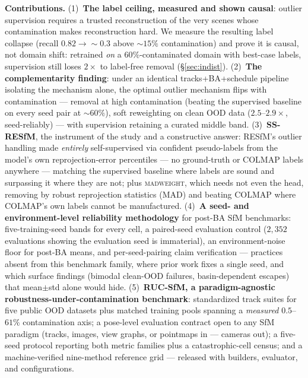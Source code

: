 \documentclass[10pt,twocolumn,letterpaper]{article}
\newcommand{\mad}{\textsc{madweight}}
\begin{document}
\noindent\textbf{Contributions.}
(1)~\textbf{The label ceiling, measured and shown causal}: outlier supervision requires a
trusted reconstruction of the very scenes whose contamination makes reconstruction hard.
We measure the resulting label collapse (recall $0.82\!\to\!\sim\!0.3$ above
${\sim}15\%$ contamination) and prove it is causal, not domain shift: retrained
\emph{on} a $60\%$-contaminated domain with best-case labels, supervision still loses
$2\times$ to label-free removal (\S\ref{sec:indist}).
(2)~\textbf{The complementarity finding}: under an identical tracks+BA+schedule pipeline
isolating the mechanism alone, the optimal outlier mechanism flips with contamination ---
removal at high contamination (beating the supervised baseline on every seed pair at
$\sim\!60\%$), soft reweighting on clean OOD data ($2.5$--$2.9\times$, seed-reliably) ---
with supervision retaining a curated middle band.
(3)~\textbf{SS-RESfM}, the instrument of the study and a constructive answer: RESfM's
outlier handling made \emph{entirely} self-supervised via confident pseudo-labels from
the model's own reprojection-error percentiles --- no ground-truth or COLMAP labels
anywhere --- matching the supervised baseline where labels are sound and surpassing it
where they are not; plus \mad{}, which needs not even the head, removing by robust
reprojection statistics (MAD) and beating COLMAP where COLMAP's own labels cannot be
manufactured.
(4)~\textbf{A seed- and environment-level reliability methodology} for post-BA SfM
benchmarks: five-training-seed bands for every cell, a paired-seed evaluation control
($2{,}352$ evaluations showing the evaluation seed is immaterial), an
environment-noise floor for post-BA means, and per-seed-pairing claim verification ---
practices absent from this benchmark family, where prior work fixes a single seed, and
which surface findings (bimodal clean-OOD failures, basin-dependent escapes) that
mean$\pm$std alone would hide.
(5)~\textbf{RUC-SfM, a paradigm-agnostic robustness-under-contamination benchmark}:
standardized track suites for five public OOD datasets plus matched training pools
spanning a \emph{measured} $0.5$--$61\%$ contamination axis; a pose-level evaluation
contract open to any SfM paradigm (tracks, images, view graphs, or pointmaps in ---
cameras out); a five-seed protocol reporting both metric families plus a
catastrophic-cell census; and a machine-verified nine-method reference grid ---
released with builders, evaluator, and configurations.
\end{document}
